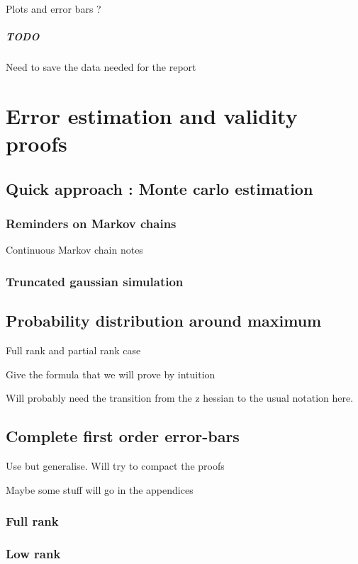 \documentclass[10pt]{report}
\theoremstyle{plain}
\theoremstyle{definition}
\theoremstyle{remark}
\begin{document}
Plots and error bars ?

\paragraph{TODO} Need to save the data needed for the report

\chapter{Error estimation and validity proofs}
\section{Quick approach : Monte carlo estimation}
\subsection{Reminders on Markov chains}

Continuous Markov chain notes

\subsection{Truncated gaussian simulation}

\section{Probability distribution around maximum}

Full rank and partial rank case

Give the formula that we will prove by intuition

Will probably need the transition from the z hessian to the usual notation here.

\section{Complete first order error-bars}

Use \cite{SPRAL17} but generalise. Will try to compact the proofs

Maybe some stuff will go in the appendices
\subsection{Full rank}

\subsection{Low rank}
\end{document}

